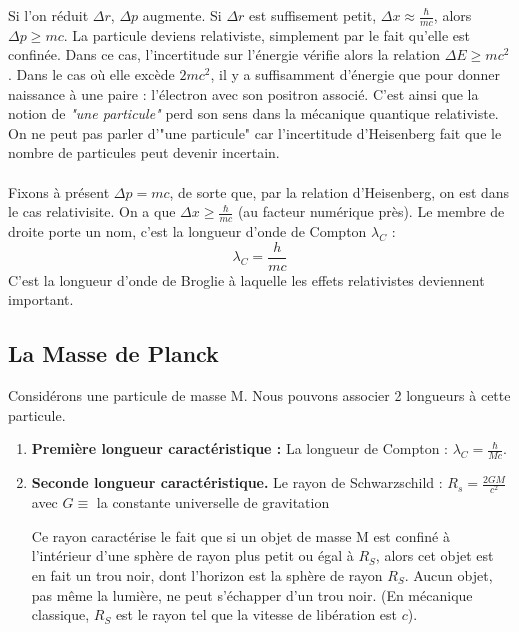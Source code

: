 \documentclass{book}
\begin{document}
Si l'on réduit $\Delta r$, $\Delta p$ augmente. 
Si $\Delta r$ est suffisement petit, $\Delta x \approx \frac{\hbar}{mc}$, alors
$\Delta p \geq mc$. La particule deviens relativiste, simplement par le fait qu'elle est confinée. Dans ce cas, l'incertitude sur l'énergie vérifie alors la relation 
 $ \Delta E \geq mc^2$.
 Dans le cas où elle excède $2mc^2$, il y a suffisamment d'énergie que pour donner naissance à une paire : l'électron avec son positron associé. C'est ainsi que la notion de \textit{"une particule"} perd son sens dans la mécanique quantique relativiste. On ne peut pas parler d'"une particule" car l'incertitude d'Heisenberg fait que le nombre de particules peut devenir incertain.



\paragraph{} Fixons à présent $\Delta p = mc$, de sorte que, par la relation d'Heisenberg, on est dans le cas relativisite. On a que $\Delta x \geq \frac{\hbar}{mc}$ (au facteur numérique près). Le membre de droite porte un nom, c'est la longueur d'onde de Compton $\lambda_C$ : \begin{equation}
    \label{longueur d'onde de compton}
    \lambda_C = \frac{h}{mc}
\end{equation}
\newline  C'est la longueur d'onde de Broglie à laquelle les effets relativistes deviennent important.



\subsection{La Masse de Planck}
Considérons une particule de masse M. Nous pouvons associer 2 longueurs à cette particule.
\begin{enumerate}
\item \textbf{Première longueur caractéristique :} La longueur de Compton : $\lambda_C = \frac{\hbar}{Mc}$.
\item \textbf{Seconde longueur caractéristique.} Le rayon de Schwarzschild : $R_s = \frac{2GM}{c^2}$ 
avec $G \equiv$ la constante universelle de gravitation

Ce rayon caractérise le fait que si un objet de masse M est confiné à l'intérieur d'une sphère de rayon plus petit ou égal à $R_S$, alors cet objet est en fait un trou noir, dont l'horizon est la sphère de rayon $R_S$. 
 Aucun objet, pas même la lumière, ne peut s'échapper d'un trou noir. (En mécanique classique, $R_S$ est le rayon tel que la vitesse de libération est $c$). 
\end{enumerate}
\end{document}
